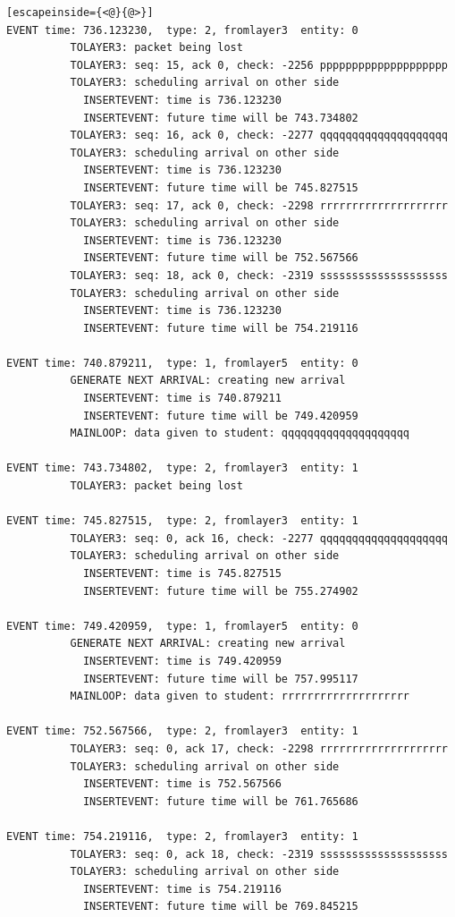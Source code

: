 \documentclass[paper=a4, fontsize=11pt]{scrartcl}
\numberwithin{equation}{section}		%
\numberwithin{figure}{section}			%
\numberwithin{table}{section}				%
\begin{document}
\begin{lstlisting}[escapeinside={<@}{@>}]
EVENT time: 736.123230,  type: 2, fromlayer3  entity: 0
          TOLAYER3: packet being lost
          TOLAYER3: seq: 15, ack 0, check: -2256 pppppppppppppppppppp
          TOLAYER3: scheduling arrival on other side
            INSERTEVENT: time is 736.123230
            INSERTEVENT: future time will be 743.734802
          TOLAYER3: seq: 16, ack 0, check: -2277 qqqqqqqqqqqqqqqqqqqq
          TOLAYER3: scheduling arrival on other side
            INSERTEVENT: time is 736.123230
            INSERTEVENT: future time will be 745.827515
          TOLAYER3: seq: 17, ack 0, check: -2298 rrrrrrrrrrrrrrrrrrrr
          TOLAYER3: scheduling arrival on other side
            INSERTEVENT: time is 736.123230
            INSERTEVENT: future time will be 752.567566
          TOLAYER3: seq: 18, ack 0, check: -2319 ssssssssssssssssssss
          TOLAYER3: scheduling arrival on other side
            INSERTEVENT: time is 736.123230
            INSERTEVENT: future time will be 754.219116

EVENT time: 740.879211,  type: 1, fromlayer5  entity: 0
          GENERATE NEXT ARRIVAL: creating new arrival
            INSERTEVENT: time is 740.879211
            INSERTEVENT: future time will be 749.420959
          MAINLOOP: data given to student: qqqqqqqqqqqqqqqqqqqq

EVENT time: 743.734802,  type: 2, fromlayer3  entity: 1
          TOLAYER3: packet being lost

EVENT time: 745.827515,  type: 2, fromlayer3  entity: 1
          TOLAYER3: seq: 0, ack 16, check: -2277 qqqqqqqqqqqqqqqqqqqq
          TOLAYER3: scheduling arrival on other side
            INSERTEVENT: time is 745.827515
            INSERTEVENT: future time will be 755.274902

EVENT time: 749.420959,  type: 1, fromlayer5  entity: 0
          GENERATE NEXT ARRIVAL: creating new arrival
            INSERTEVENT: time is 749.420959
            INSERTEVENT: future time will be 757.995117
          MAINLOOP: data given to student: rrrrrrrrrrrrrrrrrrrr

EVENT time: 752.567566,  type: 2, fromlayer3  entity: 1
          TOLAYER3: seq: 0, ack 17, check: -2298 rrrrrrrrrrrrrrrrrrrr
          TOLAYER3: scheduling arrival on other side
            INSERTEVENT: time is 752.567566
            INSERTEVENT: future time will be 761.765686

EVENT time: 754.219116,  type: 2, fromlayer3  entity: 1
          TOLAYER3: seq: 0, ack 18, check: -2319 ssssssssssssssssssss
          TOLAYER3: scheduling arrival on other side
            INSERTEVENT: time is 754.219116
            INSERTEVENT: future time will be 769.845215


\end{lstlisting}
\end{document}
